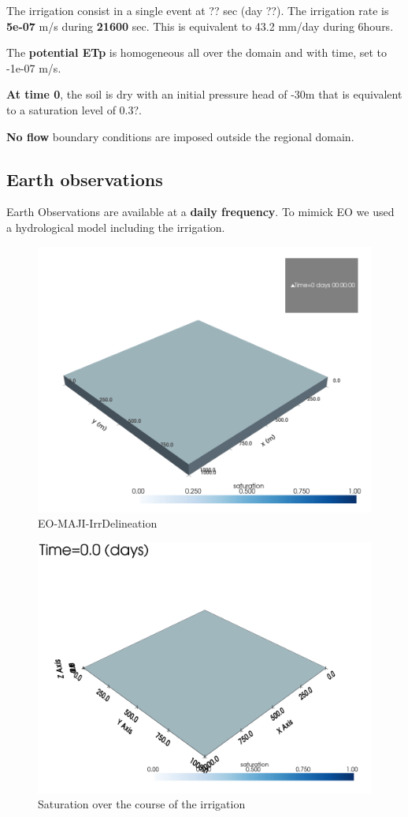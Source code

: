 \documentclass{article}
\begin{document}
The irrigation consist in a single event at ?? sec (day ??).
The irrigation rate is \textbf{5e-07} m/s during \textbf{21600} sec. This is equivalent to 43.2 mm/day during 6hours.

The \textbf{potential ETp} is homogeneous all over the domain and with time, set to -1e-07 m/s.

\textbf{At time 0}, the soil is dry with an initial pressure head of -30m that is equivalent to a saturation level of 0.3?.

\textbf{No flow} boundary conditions are imposed outside the regional domain.

\subsection{Earth observations}

Earth Observations are available at a \textbf{daily frequency}. To mimick EO we used a hydrological model including the irrigation.

\begin{figure}[!htbp]
\centering
\includegraphics[width=0.75\linewidth]{files/EOMAJI_mesh-509781dd4b086cb32383299dabc9f88d.png}
\caption*{EO-MAJI-IrrDelineation}
\end{figure}

\begin{figure}[!htbp]
\centering
\includegraphics[width=0.75\linewidth]{files/vtksaturation-6351a4b146f09c4ae6b6fcd05adccf86.gif}
\caption*{Saturation over the course of the irrigation}
\end{figure}
\end{document}
